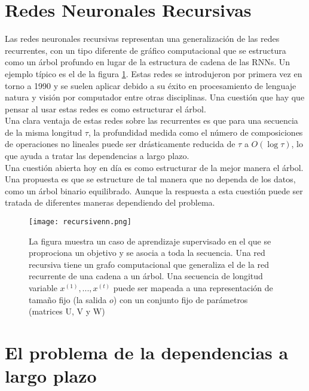        
        
\section{Redes Neuronales Recursivas}

    Las redes neuronales recursivas representan una generalización de las redes recurrentes, con un tipo diferente de gráfico computacional que se estructura como un árbol profundo en lugar de la estructura de cadena de las RNNs. Un ejemplo típico es el de la figura \ref{fig:reNN}. Estas redes se introdujeron por primera vez en torno a 1990 y se suelen aplicar debido a su éxito en procesamiento de lenguaje natura y visión por computador entre otras disciplinas. Una cuestión que hay que pensar al usar estas redes es como estructurar el árbol. \\
        
    Una clara ventaja de estas redes sobre las recurrentes es que para una secuencia de la misma longitud $\tau$, la profundidad medida como el número de composiciones de operaciones no lineales puede ser drásticamente reducida de $\tau$ a $O(\log \tau)$, lo que ayuda a tratar las dependencias a largo plazo. \\
        
    Una cuestión abierta hoy en día es como estructurar de la mejor manera el árbol. Una propuesta es que se estructure de tal manera que no dependa de los datos, como un árbol binario equilibrado. Aunque la respuesta a esta cuestión puede ser tratada de diferentes maneras dependiendo del problema.
        
        \begin{figure}[htpb]
                \centering
                \texttt{[image: recursivenn.png]}
                \caption{La figura muestra un caso de aprendizaje supervisado en el que se proprociona un objetivo y se asocia a toda la secuencia. Una red recursiva tiene un grafo computacional que generaliza el de la red recurrente de una cadena a un árbol. Una secuencia de longitud variable $x^{(1)},...,x^{(t)}$ puede ser mapeada a una representación de tamaño fijo (la salida $o$) con un conjunto fijo de parámetros (matrices U, V y W) }
                \label{fig:reNN}
        \end{figure}
        
        
\section{El problema de la dependencias a largo plazo}\label{seccion:sorpresa}


